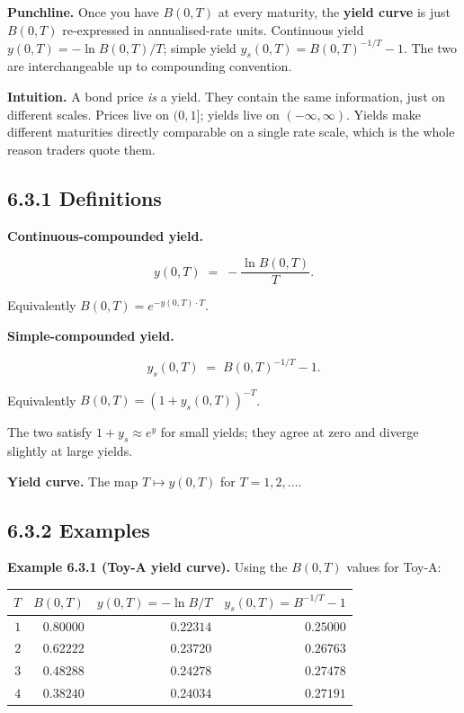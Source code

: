 \documentclass[
  10pt,
  twoside]{book}
\newcounter{none} %
\begin{document}
\textbf{Punchline.} Once you have \(B(0, T)\) at every maturity, the
\textbf{yield curve} is just \(B(0, T)\) re-expressed in annualised-rate
units. Continuous yield \(y(0, T) = -\ln B(0, T)/T\); simple yield
\(y_s(0, T) = B(0, T)^{-1/T} - 1\). The two are interchangeable up to
compounding convention.

\textbf{Intuition.} A bond price \emph{is} a yield. They contain the
same information, just on different scales. Prices live on \((0, 1]\);
yields live on \((-\infty, \infty)\). Yields make different maturities
directly comparable on a single rate scale, which is the whole reason
traders quote them.

\subsection{6.3.1 Definitions}\label{definitions-18}

\textbf{Continuous-compounded yield.}

\[y(0, T) \;=\; -\frac{\ln B(0, T)}{T}.\]

Equivalently \(B(0, T) = e^{-y(0, T) \cdot T}\).

\textbf{Simple-compounded yield.}

\[y_s(0, T) \;=\; B(0, T)^{-1/T} - 1.\]

Equivalently \(B(0, T) = (1 + y_s(0, T))^{-T}\).

The two satisfy \(1 + y_s \approx e^{y}\) for small yields; they agree
at zero and diverge slightly at large yields.

\textbf{Yield curve.} The map \(T \mapsto y(0, T)\) for
\(T = 1, 2, \ldots\).

\subsection{6.3.2 Examples}\label{examples-30}

\textbf{Example 6.3.1 (Toy-A yield curve).} Using the \(B(0, T)\) values
for Toy-A:

{\def\LTcaptype{none} %
\begin{table}[H]
\centering
\begin{tabular}{|r|r|r|r|}
\toprule
\(T\) & \(B(0, T)\) & \(y(0, T) = -\ln B/T\) &
\(y_s(0, T) = B^{-1/T} - 1\) \\
\midrule



\(1\) & \(0.80000\) & \(0.22314\) & \(0.25000\) \\
\(2\) & \(0.62222\) & \(0.23720\) & \(0.26763\) \\
\(3\) & \(0.48288\) & \(0.24278\) & \(0.27478\) \\
\(4\) & \(0.38240\) & \(0.24034\) & \(0.27191\) \\
\bottomrule
\end{tabular}
\end{table}
}
\end{document}
